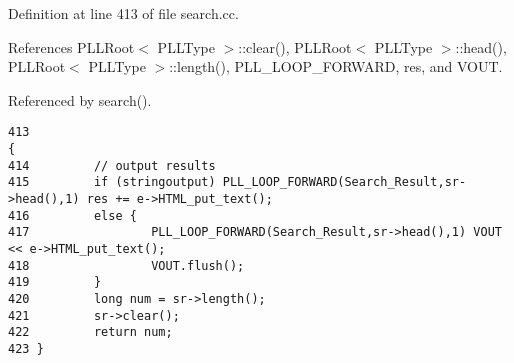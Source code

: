 Definition at line 413 of file search.cc.

References PLLRoot$<$ PLLType $>$::clear(), PLLRoot$<$ PLLType $>$::head(), PLLRoot$<$ PLLType $>$::length(), PLL\_\-LOOP\_\-FORWARD, res, and VOUT.

Referenced by search().



\footnotesize\begin{verbatim}413                                                                                         {
414         // output results
415         if (stringoutput) PLL_LOOP_FORWARD(Search_Result,sr->head(),1) res += e->HTML_put_text();
416         else {
417                 PLL_LOOP_FORWARD(Search_Result,sr->head(),1) VOUT << e->HTML_put_text();
418                 VOUT.flush();
419         }
420         long num = sr->length();
421         sr->clear();
422         return num;
423 }
\end{verbatim}\normalsize 
